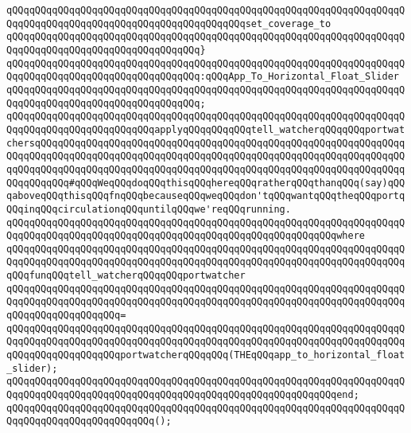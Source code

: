 \verb|qQQqqQQqqQQqqQQqqQQqqQQqqQQqqQQqqQQqqQQqqQQqqQQqqQQqqQQqqQQqqQQqqQQqqQQqqQQqqQQqqQQqqQQqqQQqqQQqqQQqqQQqqQQqqQQqset_coverage_to|\newline
\verb|qQQqqQQqqQQqqQQqqQQqqQQqqQQqqQQqqQQqqQQqqQQqqQQqqQQqqQQqqQQqqQQqqQQqqQQqqQQqqQQqqQQqqQQqqQQqqQQqqQQqqQQq}|\newline
\verb|qQQqqQQqqQQqqQQqqQQqqQQqqQQqqQQqqQQqqQQqqQQqqQQqqQQqqQQqqQQqqQQqqQQqqQQqqQQqqQQqqQQqqQQqqQQqqQQqqQQqqQQq:qQQqApp_To_Horizontal_Float_Slider|\newline
\verb|qQQqqQQqqQQqqQQqqQQqqQQqqQQqqQQqqQQqqQQqqQQqqQQqqQQqqQQqqQQqqQQqqQQqqQQqqQQqqQQqqQQqqQQqqQQqqQQqqQQqqQQq;|\newline
\newline
\verb|qQQqqQQqqQQqqQQqqQQqqQQqqQQqqQQqqQQqqQQqqQQqqQQqqQQqqQQqqQQqqQQqqQQqqQQqqQQqqQQqqQQqqQQqqQQqqQQqapplyqQQqqQQqqQQqtell_watcherqQQqqQQqportwatchersqQQqqQQqqQQqqQQqqQQqqQQqqQQqqQQqqQQqqQQqqQQqqQQqqQQqqQQqqQQqqQQqqQQqqQQqqQQqqQQqqQQqqQQqqQQqqQQqqQQqqQQqqQQqqQQqqQQqqQQqqQQqqQQqqQQqqQQqqQQqqQQqqQQqqQQqqQQqqQQqqQQqqQQqqQQqqQQqqQQqqQQqqQQqqQQqqQQqqQQqqQQqqQQqqQQqqQQq#qQQqWeqQQqdoqQQqthisqQQqhereqQQqratherqQQqthanqQQq(say)qQQqaboveqQQqthisqQQqfnqQQqbecauseqQQqweqQQqdon'tqQQqwantqQQqtheqQQqportqQQqinqQQqcirculationqQQquntilqQQqwe'reqQQqrunning.|\newline
\verb|qQQqqQQqqQQqqQQqqQQqqQQqqQQqqQQqqQQqqQQqqQQqqQQqqQQqqQQqqQQqqQQqqQQqqQQqqQQqqQQqqQQqqQQqqQQqqQQqqQQqqQQqqQQqqQQqqQQqqQQqqQQqqQQqwhere|\newline
\verb|qQQqqQQqqQQqqQQqqQQqqQQqqQQqqQQqqQQqqQQqqQQqqQQqqQQqqQQqqQQqqQQqqQQqqQQqqQQqqQQqqQQqqQQqqQQqqQQqqQQqqQQqqQQqqQQqqQQqqQQqqQQqqQQqqQQqqQQqqQQqqQQqfunqQQqtell_watcherqQQqqQQqportwatcher|\newline
\verb|qQQqqQQqqQQqqQQqqQQqqQQqqQQqqQQqqQQqqQQqqQQqqQQqqQQqqQQqqQQqqQQqqQQqqQQqqQQqqQQqqQQqqQQqqQQqqQQqqQQqqQQqqQQqqQQqqQQqqQQqqQQqqQQqqQQqqQQqqQQqqQQqqQQqqQQqqQQqqQQq=|\newline
\verb|qQQqqQQqqQQqqQQqqQQqqQQqqQQqqQQqqQQqqQQqqQQqqQQqqQQqqQQqqQQqqQQqqQQqqQQqqQQqqQQqqQQqqQQqqQQqqQQqqQQqqQQqqQQqqQQqqQQqqQQqqQQqqQQqqQQqqQQqqQQqqQQqqQQqqQQqqQQqqQQqportwatcherqQQqqQQq(THEqQQqapp_to_horizontal_float_slider);|\newline
\verb|qQQqqQQqqQQqqQQqqQQqqQQqqQQqqQQqqQQqqQQqqQQqqQQqqQQqqQQqqQQqqQQqqQQqqQQqqQQqqQQqqQQqqQQqqQQqqQQqqQQqqQQqqQQqqQQqqQQqqQQqqQQqqQQqend;|\newline
\verb|qQQqqQQqqQQqqQQqqQQqqQQqqQQqqQQqqQQqqQQqqQQqqQQqqQQqqQQqqQQqqQQqqQQqqQQqqQQqqQQqqQQqqQQqqQQqqQQq();|\newline
